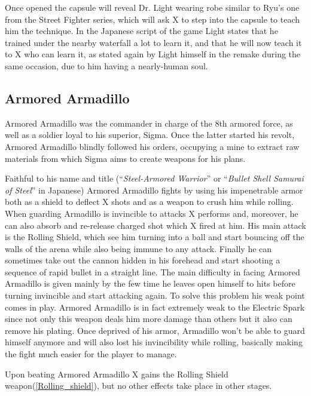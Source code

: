 Once opened the capsule will reveal Dr. Light wearing robe similar to Ryu's one from the Street Fighter series, which will ask X to step into the capsule to teach him the technique. In the Japanese  script of the game\cite{wordpress:X_japanese_script} Light states that he trained under the nearby waterfall a lot to learn it, and that he will now teach it to X who can learn it, as stated again by Light himself in the \mhx remake during the same occasion, due to him having a nearly-human soul.

\subsection{Armored Armadillo}\label{boss:Armored_Armadillo}
Armored Armadillo was the commander in charge of the 8th armored force, as well as a soldier loyal to his superior, Sigma. Once the latter started his revolt, Armored Armadillo blindly followed his orders, occupying a mine to extract raw materials from which Sigma aims to create weapons for his plans.

Faithful to his name and title (``\textit{Steel-Armored Warrior}''\cite{MHX:manual} or ``\textit{Bullet Shell Samurai of Steel}''\cite{wayback:X_resources} in Japanese) Armored Armadillo fights by using his impenetrable armor both as a shield to deflect X shots and as a weapon to crush him while rolling. When guarding Armadillo is invincible to attacks X performs and, moreover, he can also absorb and re-release charged shot which X fired at him. His main attack is the Rolling Shield, which see him turning into a ball and start bouncing off the walls of the arena while also being immune to any attack. Finally he can sometimes take out the cannon hidden in his forehead and start shooting a sequence of rapid bullet in a straight line. The main difficulty in facing Armored Armadillo is given mainly by the few time he leaves open himself to hits before turning invincible and start attacking again. To solve this problem his weak point comes in play. Armored Armadillo is in fact extremely weak to the Electric Spark since not only this weapon deals him more damage than others but it also can remove his plating. Once deprived of his armor, Armadillo won't be able to guard himself anymore and will also lost his invincibility while rolling, basically making the fight much easier for the player to manage.

Upon beating Armored Armadillo X gains the Rolling Shield weapon(\ref{Rolling_shield}), but no other effects take place in other stages.

